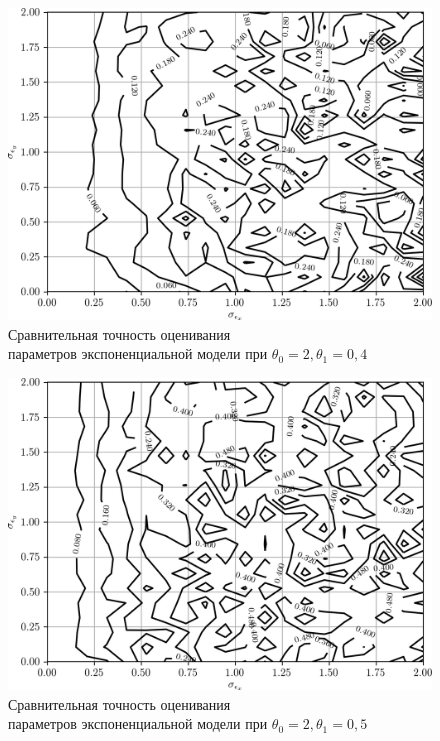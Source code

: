 \begin{figure}[p]
  \centering
  \includegraphics[width=135mm]{fig/nonlinear/exponential/a-2_b-0,4.png}
  \caption{
    Сравнительная точность оценивания \\
    параметров экспоненциальной модели при \( \theta_0 = 2, \theta_1 = 0{,}4 \)
  }\label{fig:comparison_nonlinear_exponential_a-2_b-0,4}
\end{figure}

\begin{figure}[p]
  \centering
  \includegraphics[width=135mm]{fig/nonlinear/exponential/a-2_b-0,5.png}
  \caption{
    Сравнительная точность оценивания \\
    параметров экспоненциальной модели при \( \theta_0 = 2, \theta_1 = 0{,}5 \)
  }\label{fig:comparison_nonlinear_exponential_a-2_b-0,5}
\end{figure}

